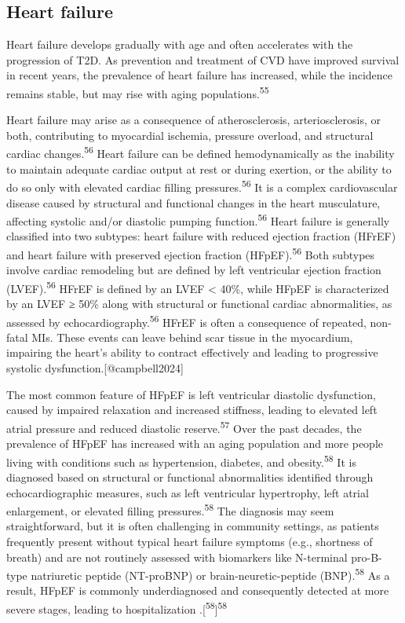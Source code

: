 \documentclass[
  letterpaper,
  headsepline=true,
  open=any]{scrbook}
\begin{document}
\hypertarget{heart-failure}{%
\subsection{Heart failure}\label{heart-failure}}

Heart failure develops gradually with age and often accelerates with the
progression of T2D. As prevention and treatment of CVD have improved
survival in recent years, the prevalence of heart failure has increased,
while the incidence remains stable, but may rise with aging
populations.\textsuperscript{55}

Heart failure may arise as a consequence of atherosclerosis,
arteriosclerosis, or both, contributing to myocardial ischemia, pressure
overload, and structural cardiac changes.\textsuperscript{56} Heart
failure can be defined hemodynamically as the inability to maintain
adequate cardiac output at rest or during exertion, or the ability to do
so only with elevated cardiac filling pressures.\textsuperscript{56} It
is a complex cardiovascular disease caused by structural and functional
changes in the heart musculature, affecting systolic and/or diastolic
pumping function.\textsuperscript{56} Heart failure is generally
classified into two subtypes: heart failure with reduced ejection
fraction (HFrEF) and heart failure with preserved ejection fraction
(HFpEF).\textsuperscript{56} Both subtypes involve cardiac remodeling
but are defined by left ventricular ejection fraction
(LVEF).\textsuperscript{56} HFrEF is defined by an LVEF \textless{}
40\%, while HFpEF is characterized by an LVEF ≥ 50\% along with
structural or functional cardiac abnormalities, as assessed by
echocardiography.\textsuperscript{56} HFrEF is often a consequence of
repeated, non-fatal MIs. These events can leave behind scar tissue in
the myocardium, impairing the heart's ability to contract effectively
and leading to progressive systolic dysfunction.{[}@campbell2024{]}

The most common feature of HFpEF is left ventricular diastolic
dysfunction, caused by impaired relaxation and increased stiffness,
leading to elevated left atrial pressure and reduced diastolic
reserve.\textsuperscript{57} Over the past decades, the prevalence of
HFpEF has increased with an aging population and more people living with
conditions such as hypertension, diabetes, and
obesity.\textsuperscript{58} It is diagnosed based on structural or
functional abnormalities identified through echocardiographic measures,
such as left ventricular hypertrophy, left atrial enlargement, or
elevated filling pressures.\textsuperscript{58} The diagnosis may seem
straightforward, but it is often challenging in community settings, as
patients frequently present without typical heart failure symptoms
(e.g., shortness of breath) and are not routinely assessed with
biomarkers like N-terminal pro-B-type natriuretic peptide (NT-proBNP) or
brain-neuretic-peptide (BNP).\textsuperscript{58} As a result, HFpEF is
commonly underdiagnosed and consequently detected at more severe stages,
leading to hospitalization
.{[}\textsuperscript{58}{]}\textsuperscript{58}
\end{document}
